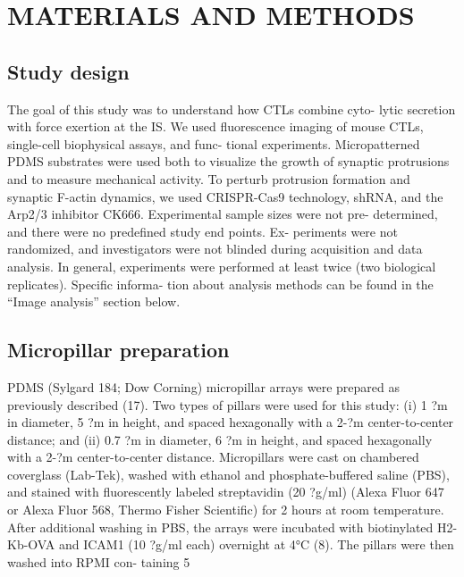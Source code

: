 \section{MATERIALS AND METHODS}
\subsection{Study design}
The goal of this study was to understand how CTLs combine cyto- lytic secretion with force exertion at the IS. We used fluorescence imaging of mouse CTLs, single-cell biophysical assays, and func- tional experiments. Micropatterned PDMS substrates were used both to visualize the growth of synaptic protrusions and to measure mechanical activity. To perturb protrusion formation and synaptic F-actin dynamics, we used CRISPR-Cas9 technology, shRNA, and the Arp2/3 inhibitor CK666. Experimental sample sizes were not pre- determined, and there were no predefined study end points. Ex- periments were not randomized, and investigators were not blinded during acquisition and data analysis. In general, experiments were performed at least twice (two biological replicates). Specific informa- tion about analysis methods can be found in the “Image analysis” section below.

\subsection{Micropillar preparation}
PDMS (Sylgard 184; Dow Corning) micropillar arrays were prepared as previously described (17). Two types of pillars were used for this study: (i) 1 ?m in diameter, 5 ?m in height, and spaced hexagonally with a 2-?m center-to-center distance; and (ii) 0.7 ?m in diameter, 6 ?m in height, and spaced hexagonally with a 2-?m center-to-center distance. Micropillars were cast on chambered coverglass (Lab-Tek), washed with ethanol and phosphate-buffered saline (PBS), and stained with fluorescently labeled streptavidin (20 ?g/ml) (Alexa Fluor 647 or Alexa Fluor 568, Thermo Fisher Scientific) for 2 hours at room temperature. After additional washing in PBS, the arrays were incubated with biotinylated H2-Kb-OVA and ICAM1 (10 ?g/ml each) overnight at 4°C (8). The pillars were then washed into RPMI con- taining 5%

